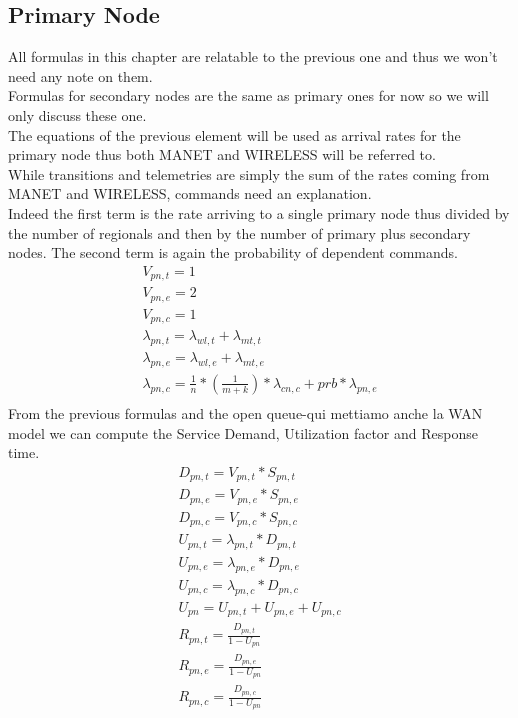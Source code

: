 \documentclass[11pt]{article}
\begin{document}
\subsection{Primary Node}
All formulas in this chapter are relatable to the previous one and thus we won't need any note on them.\\
Formulas for secondary nodes are the same as primary ones for now so we will only discuss these one.\\
The equations of the previous element will be used as arrival rates for the primary node thus both MANET and WIRELESS will be referred to.\\
While transitions and telemetries are simply the sum of the rates coming from MANET and WIRELESS, commands need an explanation.\\
Indeed the first term is the rate arriving to a single primary node thus divided by the number of regionals and then by the number of primary plus secondary nodes. The second term is again the probability of dependent commands.
\begin{equation}
    \begin{array}{l}
        V_{pn, t} = 1 \\
        V_{pn, e} = 2 \\ %
        V_{pn,c} = 1 \\
        \lambda_{pn, t} = \lambda_{wl, t} + \lambda_{mt, t} \\
        \lambda_{pn, e} = \lambda_{wl, e} + \lambda_{mt, e} \\
        \lambda_{pn, c} = \frac{1}{n} * (\frac{1}{m+k}) * \lambda_{cn, c} + prb * \lambda_{pn, e}  \\\
    \end{array}
\end{equation}
From the previous formulas and the open queue-qui mettiamo anche la WAN model we can compute the Service Demand, Utilization factor and Response time.
\begin{equation}
    \begin{array}{l}
        D_{pn, t} = V_{pn, t} * S_{pn, t} \\
        D_{pn, e} = V_{pn, e} * S_{pn, e} \\
        D_{pn, c} = V_{pn, c} * S_{pn, c} \\
        U_{pn, t} = \lambda_{pn, t} * D_{pn, t} \\
        U_{pn, e} = \lambda_{pn, e} * D_{pn, e} \\
        U_{pn, c} = \lambda_{pn, c} * D_{pn, c} \\
        U_{pn} = U_{pn, t} + U_{pn, e} + U_{pn, c} \\
        R_{pn, t} = \frac{D_{pn, t}}{1 - U_{pn}} \\
        R_{pn, e} = \frac{D_{pn, e}}{1 - U_{pn}} \\
        R_{pn, c} = \frac{D_{pn, c}}{1 - U_{pn}} \\
    \end{array}
\end{equation}
\end{document}
